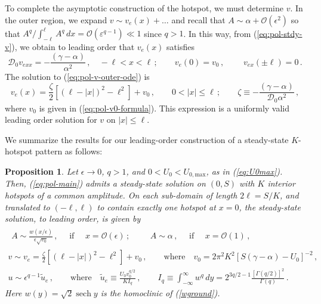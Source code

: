 \documentclass{article}%
\newtheorem{prop}[theorem]{Proposition}
\newcommand{\eps}{{\displaystyle \varepsilon}}
\DeclareMathOperator{\sech}{sech}
\newcommand{\bsub}{\begin{subequations}}
\newcommand{\esub}{\end{subequations}$\!$}
\begin{document}
To complete the asymptotic construction of the hotspot, we must
determine $v$. In the outer region, we expand $v\sim v_{e}(x)+\dots$
and recall that $A\sim\alpha+{\mathcal O}(\epsilon^{2})$ so that
${A^q/\int_{-\ell}^{\ell} A^q \, dx}={\mathcal O}(\eps^{q-1})\ll 1$
since $q>1$. In this way, from (\ref{eq:pol-stdy-v}), we obtain to
leading order that $v_{e}(x)$ satisfies
\begin{equation}
 {\mathcal D}_{0}v_{exx}=-\frac{\left(\gamma-\alpha\right)}{\alpha^{2}} 
  \,, \quad -\ell <x<\ell \,; \qquad
v_{e}(0)=v_{0}\,,\; \qquad v_{ex}(\pm \ell)=0 \,. \label{eq:pol-v-outer-ode}
\end{equation}
The solution to (\ref{eq:pol-v-outer-ode}) is
\begin{equation}
v_{e}(x)=\frac{\zeta}{2}\left[\left(\ell-|x|\right)^{2}-\ell^{2}\right]+v_{0}
\,, \qquad 0<|x|\leq\ell \,; \qquad \zeta \equiv -
\frac{(\gamma-\alpha)}{{\mathcal D}_0 \alpha^2} \,, \label{eq:pol-v-outer-sol}
\end{equation}
where $v_{0}$ is given in (\ref{eq:pol-v0-formula}). This expression is
a uniformly valid leading order solution for $v$ on $|x|\leq \ell$.

We summarize the results for our leading-order construction of a
steady-state $K$-hotspot pattern as follows:

\begin{prop}
\label{thm: pol-symm-K-hotspots-for-main} Let $\epsilon\to 0$, $q>1$,
and $0<U_0<U_{0,\textrm{max}}$, as in (\ref{eq:U0max}). Then,
(\ref{eq:pol-main}) admits a steady-state solution on $(0,S)$ with $K$
interior hotspots of a common amplitude. On each sub-domain of length
$2\ell=S/K$, and translated to $(-\ell,\ell)$ to contain exactly one
hotspot at $x=0$, the steady-state solution, to leading order, is
given by
\bsub\label{thm:main_eq}
\begin{gather}
\begin{gathered}A\sim\frac{w(x/\epsilon)}{\epsilon \sqrt{v_{0}}}\,, \quad
\mbox{ if }\quad x={\mathcal O}(\epsilon)\,;\end{gathered}
\qquad A\sim\alpha\,, \quad \mbox{ if } \quad x={\mathcal O}(1)\,, \\
v\sim v_{e}=\frac{\zeta}{2}\left[\left(\ell-|x|\right)^{2}-\ell^{2}\right]+v_{0}
  \,, \qquad \mbox{where} \quad 
  v_{0}=2\pi^{2}K^2 \left[S(\gamma-\alpha)-U_{0}\right]^{-2}\,,\\
u\sim\epsilon^{q-1}\tilde{u}_{e}\,, \qquad \mbox{where} \quad
  \tilde{u}_{e}\equiv\frac{U_{0} v_{0}^{q/2}}{K I_{q}} \,, \qquad 
 I_{q}\equiv \int_{-\infty}^{\infty} w^q \, dy =
  2^{3q/2-1}\frac{\left[\Gamma(q/2)\right]^2}{\Gamma(q)} \,.
\end{gather}
\esub Here $w(y)=\sqrt{2}\sech y$ is the homoclinic of (\ref{wground}).
\end{prop}
\end{document}
